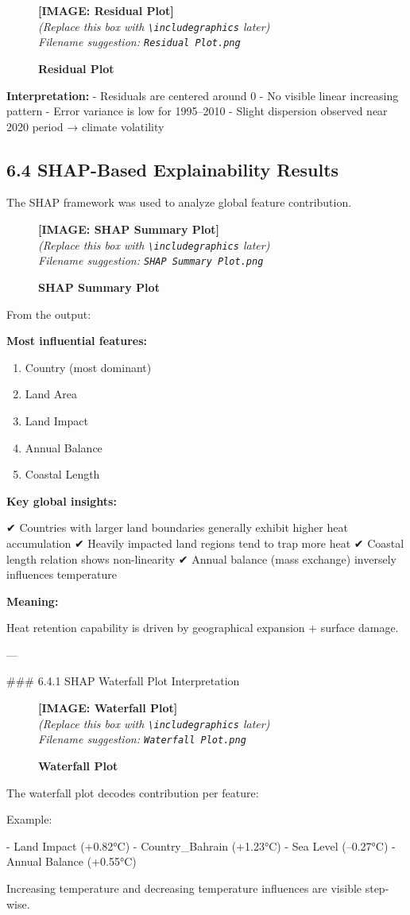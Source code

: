 \documentclass[12pt, a4paper]{article}
\newcommand{\imageplaceholder}[2]{
  \begin{figure}[H]
    \centering
    \begin{tcolorbox}[colback=white, colframe=black, width=0.8\textwidth, arc=0mm, boxrule=1pt]
      \centering
      \vspace{#2}
      \textbf{\Large [IMAGE: #1]}\\
      \vspace{0.5cm}
      \textit{(Replace this box with \texttt{\textbackslash includegraphics} later)}\\
      \textit{Filename suggestion: \texttt{#1.png}}
      \vspace{#2}
    \end{tcolorbox}
    \caption{\textbf{#1}}
    \label{fig:#1}
  \end{figure}
}
\begin{document}
\imageplaceholder{Residual Plot}{6cm}

\textbf{Interpretation:}
- Residuals are centered around 0
- No visible linear increasing pattern
- Error variance is low for 1995–2010
- Slight dispersion observed near 2020 period → climate volatility


\subsection{\textbf{6.4 SHAP-Based Explainability Results}}

The SHAP framework was used to analyze global feature contribution.

\imageplaceholder{SHAP Summary Plot}{6cm}

From the output:

\textbf{Most influential features:}
\begin{enumerate}
    \item Country (most dominant)
    \item Land Area
    \item Land Impact
    \item Annual Balance
    \item Coastal Length
\end{enumerate}

\textbf{Key global insights:}

✔ Countries with larger land boundaries generally exhibit higher heat accumulation  
✔ Heavily impacted land regions tend to trap more heat  
✔ Coastal length relation shows non-linearity  
✔ Annual balance (mass exchange) inversely influences temperature  

\textbf{Meaning:}

Heat retention capability is driven by geographical expansion + surface damage.

---

### 6.4.1 SHAP Waterfall Plot Interpretation

\imageplaceholder{Waterfall Plot}{6cm}

The waterfall plot decodes contribution per feature:

Example:

- Land Impact (+0.82°C)
- Country\_Bahrain (+1.23°C)
- Sea Level (–0.27°C)
- Annual Balance (+0.55°C)

Increasing temperature and decreasing temperature influences are visible step-wise.
\end{document}
